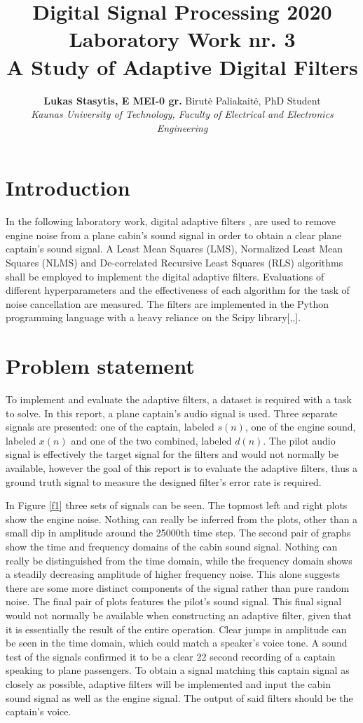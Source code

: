\documentclass[10pt,a4paper,twocolumn]{article}
\title{{\large Digital Signal Processing 2020}\\ \vspace{-12pt} 
{\normalsize{ Laboratory Work nr. 3}}\\
{\Large \textbf{A Study of Adaptive Digital Filters}}}
\author{\large \textbf{Lukas Stasytis, E MEI-0 gr.} Birutė Paliakaitė, PhD Student \\
{\normalsize \textit{Kaunas University of Technology, Faculty of Electrical and Electronics Engineering}}}
\date{}
\begin{document}
\maketitle

\section*{Introduction}

In the following laboratory work, digital adaptive filters \cite{a1},\cite{a2} are used to remove engine noise from a plane cabin's sound signal in order to obtain a clear plane captain's sound signal. A Least Mean Squares (LMS), Normalized Least Mean Squares (NLMS) and De-correlated Recursive Least Squares (RLS) algorithms shall be employed to implement the digital adaptive filters. Evaluations of different hyperparameters and the effectiveness of each algorithm for the task of noise cancellation are measured. The filters are implemented in the Python programming language with a heavy reliance on the Scipy library[\cite{numpy},\cite{scipy},\cite{pyplot}].


\section*{Problem statement}

To implement and evaluate the adaptive filters, a dataset is required with a task to solve. In this report, a plane captain's audio signal is used. Three separate signals are presented: one of the captain, labeled $s(n)$, one of the engine sound, labeled $x(n)$ and one of the two combined, labeled $d(n)$. The pilot audio signal is effectively the target signal for the filters and would not normally be available, however the goal of this report is to evaluate the adaptive filters, thus a ground truth signal to measure the designed filter's error rate is required.

In Figure \ref{f1} three sets of signals can be seen. The topmost left and right plots show the engine noise. Nothing can really be inferred from the plots, other than a small dip in amplitude around the 25000th time step. The second pair of graphs show the time and frequency domains of the cabin sound signal. Nothing can really be distinguished from the time domain, while the frequency domain shows a steadily decreasing amplitude of higher frequency noise. This alone suggests there are some more distinct components of the signal rather than pure random noise. The final pair of plots features the pilot's sound signal. This final signal would not normally be available when constructing an adaptive filter, given that it is essentially the result of the entire operation. Clear jumps in amplitude can be seen in the time domain, which could match a speaker's voice tone. A sound test of the signals confirmed it to be a clear 22 second recording of a captain speaking to plane passengers. To obtain a signal matching this captain signal as closely as possible, adaptive filters will be implemented and input the cabin sound signal as well as the engine signal. The output of said filters should be the captain's voice.
\end{document}

